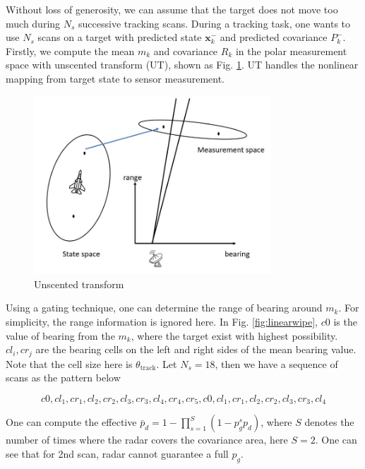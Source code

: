 \documentclass[12pt,journal,draftclsnofoot,onecolumn]{IEEEtran}
\begin{document}
Without loss of generosity, we can assume that the target does not move too much during $N_s$ successive tracking scans. During a tracking task, one wants to use $N_s$ scans on a target with predicted state $\mathbf{x}_k^{-}$ and predicted covariance $P_k^{-}$. Firstly, we compute the mean $m_k$ and  covariance $R_k$ in the polar measurement space with unscented transform (UT), shown as Fig. \ref{fig:UT}. UT handles the nonlinear mapping from target state to sensor measurement\cite{bar2004estimation}.

\begin{figure}
	\centering
	\includegraphics[width=3.5in]{UT.jpg}
	\caption{Unscented transform}
	\label{fig:UT}
\end{figure}


 Using a gating technique, one can determine the range of bearing around $m_k$. For simplicity, the range information is ignored here. In Fig. \ref{fig:linearwipe}, $c0$ is the value of bearing from the $m_k$, where the target exist with highest possibility. $cl_i,cr_j$ are the bearing cells on the left and right sides of the mean bearing value. Note that the cell size here is $\theta_{\text{track}}$. Let $N_s=18$, then we have a sequence of scans as the pattern below
 
 \begin{equation}
 	c0, cl_1, cr_1, cl_2,cr_2,cl_3,cr_3,cl_4,cr_4,cr_5,c0, cl_1, cr_1, cl_2,cr_2,cl_3,cr_3,cl_4
 \end{equation}
 
 One can compute the effective $\bar p_d=1-\prod_{s=1}^{S}(1-p_g^sp_d)$\cite{bar2004estimation}, where $S$ denotes the number of times where the radar covers the covariance area, here $S=2$. One can see that for 2nd scan, radar cannot guarantee a full $p_g$.
 
\end{document}

